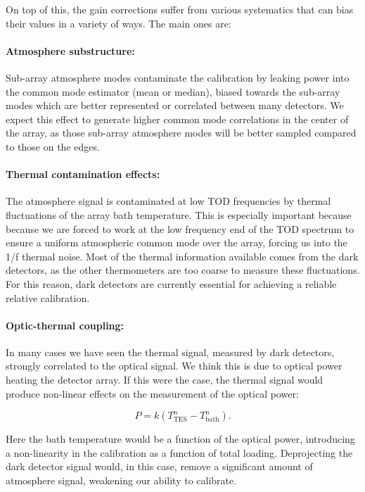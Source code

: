On top of this, the gain corrections suffer from various systematics that can bias their values in a variety of ways. The main ones are:

\paragraph{Atmosphere substructure:}
Sub-array atmosphere modes contaminate the calibration by leaking power into the common mode estimator (mean or median), biased towards the sub-array modes which are better represented or correlated between many detectors. We expect this effect to generate higher common mode correlations in the center of the array, as those sub-array atmosphere modes will be better sampled compared to those on the edges.

\paragraph{Thermal contamination effects:}
The atmosphere signal is contaminated at low TOD frequencies by thermal fluctuations of the array bath temperature. 
This is especially important because because we are forced to work at the low frequency end of the TOD spectrum to ensure a uniform atmospheric common mode over the array, forcing us into the 1/f thermal noise.
Most of the thermal information available comes from the dark detectors, as the other thermometers are too coarse to measure these fluctuations. For this reason, dark detectors are currently essential for achieving a reliable relative calibration.

\paragraph{Optic-thermal coupling:}
In many cases we have seen the thermal signal, measured by dark detectors, strongly correlated to the optical signal. We think this is due to optical power heating the detector array. If this were the case, the thermal signal would produce non-linear effects on the measurement of the optical power:

\begin{equation}
P = k(T_{\mathrm{TES}}^n-T_{\mathrm{bath}}^n).
\end{equation}

Here the bath temperature would be a function of the optical power, introducing a non-linearity in the calibration as a function of total loading. Deprojecting the dark detector signal would, in this case, remove a significant amount of atmosphere signal, weakening our ability to calibrate.

